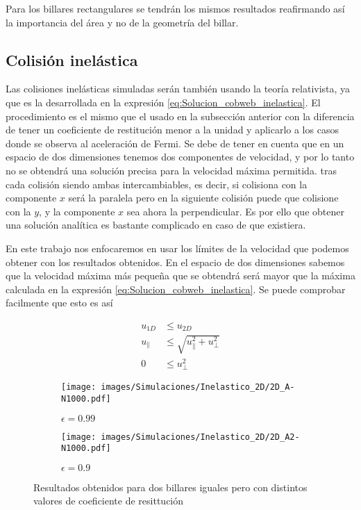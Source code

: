 Para los billares rectangulares se tendrán los mismos resultados reafirmando así la importancia del área y no de la geometría del billar. 


\subsection{Colisión inelástica}

Las colisiones inelásticas simuladas serán también usando la teoría relativista, ya que es la desarrollada en la expresión \ref{eq:Solucion_cobweb_inelastica}. El procedimiento es el mismo que el usado en la subsección anterior con la diferencia de tener un coeficiente de restitución menor a la unidad y aplicarlo a los casos donde se observa al aceleración de Fermi. Se debe de tener en cuenta que en un espacio de dos dimensiones tenemos dos componentes de velocidad, y por lo tanto no se obtendrá una solución precisa para la velocidad máxima permitida.  tras cada colisión siendo ambas intercambiables, es decir, si colisiona con la componente \( x \) será la paralela pero en la siguiente colisión puede que colisione con la \( y \), y la componente \( x \) sea ahora la perpendicular. Es por ello que obtener una solución analítica es bastante complicado en caso de que existiera. 

\vspace{3mm}

En este trabajo nos enfocaremos en usar los límites de la velocidad que podemos obtener con los resultados obtenidos. En el espacio de dos dimensiones sabemos que la velocidad máxima más pequeña que se obtendrá será mayor que la máxima calculada en la expresión \ref{eq:Solucion_cobweb_inelastica}. Se puede comprobar facilmente que esto es así

\begin{align}
    u_{1D} &\leq u_{2D} \nonumber\\
    u_{\parallel} &\leq \sqrt{u_\parallel^2 + u_\perp^2}\\
     0 &\leq u_\perp^2 \nonumber
\end{align}

\begin{figure}[!h]
    \begin{subfigure}[b]{0.5\textwidth}
        \centering
        \texttt{[image: images/Simulaciones/Inelastico\_2D/2D\_A-N1000.pdf]}
        \caption{\( \epsilon = 0.99 \)}
    \end{subfigure}
    \hfill
    \begin{subfigure}[b]{0.5\textwidth}
        \centering
        \texttt{[image: images/Simulaciones/Inelastico\_2D/2D\_A2-N1000.pdf]}
        \caption{\( \epsilon = 0.9 \)}
    \end{subfigure}
    \caption{Resultados obtenidos para dos billares iguales pero con distintos valores de coeficiente de resittución}
    \label{fig:2DR_A-N1000_Ine}
\end{figure}

